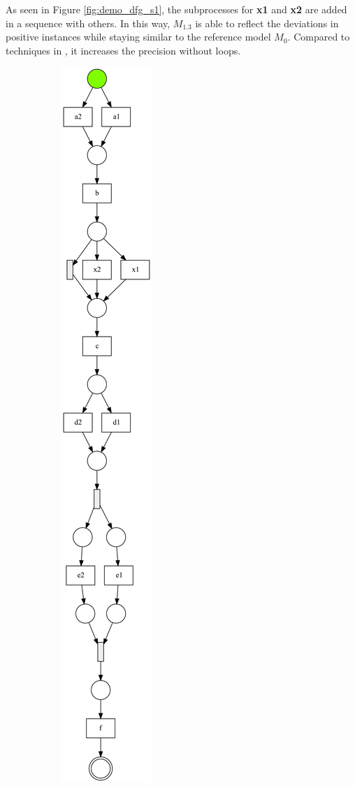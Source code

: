 As seen in Figure \ref{fig:demo_dfg_s1}, the subprocesses for \textbf{x1} and \textbf{x2} are added in a sequence with others. In this way, $M_{1.3}$ is able to reflect the deviations in positive instances while staying similar to the reference model $M_0$. Compared to techniques in \cite{fahland2015model}, it increases the precision without loops.
\begin{figure}[htp]
	\centering
	\begin{subfigure}[b]{0.31\textwidth}
		\centering
		\includegraphics[width=0.75\linewidth, height=0.8\textheight]{figures/evaluation/PN-result-demo-s1-dfg.pdf}

\end{subfigure}
\end{figure}
